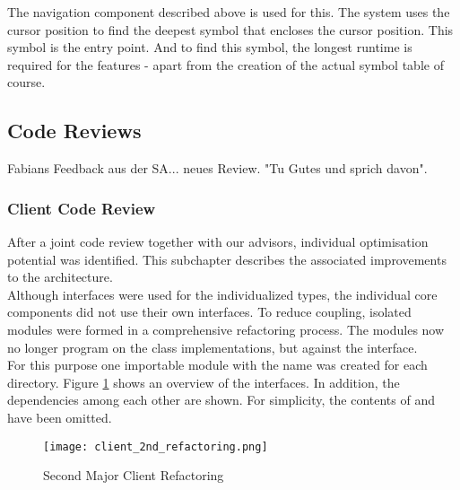 The navigation component described above is used for this. The system uses the cursor position to find the deepest symbol that encloses the cursor position. This symbol is the entry point. And to find this symbol, the longest runtime is required for the features - apart from the creation of the actual symbol table of course.




\subsection{Code Reviews}
Fabians Feedback aus der SA... neues Review. "Tu Gutes und sprich davon".

\subsubsection{Client Code Review}
After a joint code review together with our advisors, individual optimisation potential was identified.
This subchapter describes the associated improvements to the architecture. \\

Although interfaces were used for the individualized types,
the individual core components did not use their own interfaces.
To reduce coupling, isolated modules were formed in a comprehensive refactoring process.
The modules now no longer program on the class implementations, but against the interface. \\

For this purpose one importable module with the name  was created for each directory.
Figure \ref{fig:client_2nd_refactoring} shows an overview of the interfaces.
In addition, the dependencies among each other are shown.
For simplicity, the contents of  and  have been omitted. \\

\begin{figure}[H]
    \centering
    \texttt{[image: client\_2nd\_refactoring.png]}
    \caption{Second Major Client Refactoring}
    \label{fig:client_2nd_refactoring}
\end{figure}

